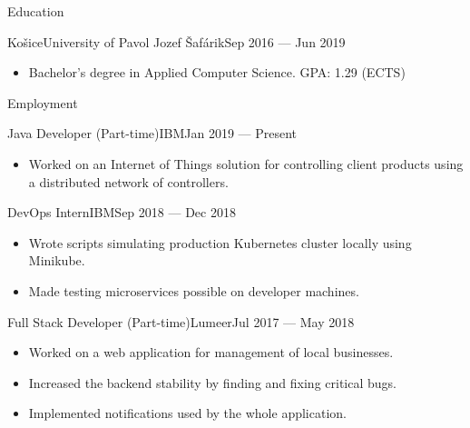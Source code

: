 \documentclass[]{style}
\begin{document}
	\makeheader
	
	\begin{cvsection}{Education}
		\begin{cvsubsection}{Košice}{University of Pavol Jozef Šafárik}{Sep 2016 — Jun 2019}
			\begin{itemize}
				\item Bachelor's degree in Applied Computer Science. GPA: 1.29 (ECTS)
			\end{itemize}
		\end{cvsubsection}
	\end{cvsection}

	\begin{cvsection}{Employment}
    	\begin{cvsubsection}{Java Developer (Part-time)}{IBM}{Jan 2019 — Present}
			\begin{itemize}
    			\item Worked on an Internet of Things solution for controlling client products using a distributed network of controllers.
			\end{itemize}
		\end{cvsubsection}
		
    	\begin{cvsubsection}{DevOps Intern}{IBM}{Sep 2018 — Dec 2018}
			\begin{itemize}
			    \item Wrote scripts simulating production Kubernetes cluster locally using Minikube.
			    \item Made testing microservices possible on developer machines.
			\end{itemize}
		\end{cvsubsection}
		
		\begin{cvsubsection}{Full Stack Developer (Part-time)}{Lumeer}{Jul 2017 — May 2018}
			\begin{itemize}
				\item Worked on a web application for management of local businesses.
				\item Increased the backend stability by finding and fixing critical bugs.
				\item Implemented notifications used by the whole application.							
			\end{itemize}
		\end{cvsubsection}
	\end{cvsection}
	
\end{document}
